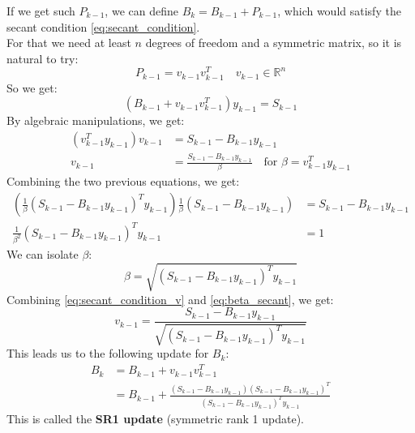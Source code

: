 \documentclass[12pt, openany]{report}
\newcommand{\R}{\mathbb{R}}
\theoremstyle{definition}
\begin{document}
If we get such $P_{k-1}$, we can define $B_k = B_{k-1} + P_{k-1}$, which would satisfy the secant condition \eqref{eq:secant_condition}.\\
For that we need at least $n$ degrees of freedom and a symmetric matrix, so it is natural to try:
\begin{equation}
	P_{k-1} = v_{k-1} v_{k-1}^T \quad v_{k-1} \in \R^{n}
\end{equation}
So we get:
\begin{equation}
	\left(B_{k-1} + v_{k-1} v_{k-1}^T\right) y_{k-1} = S_{k-1}
\end{equation}
By algebraic manipulations, we get:
\begin{equation}\label{eq:secant_condition_v}
	\begin{aligned}
		\left(v_{k-1}^T y_{k-1}\right) v_{k-1} &= S_{k-1} - B_{k-1} y_{k-1}\\
		v_{k-1} &= \frac{S_{k-1}-B_{k-1} y_{k-1}}{\beta} \quad \text{for } \beta = v_{k-1}^T y_{k-1} 
	\end{aligned}
\end{equation}
Combining the two previous equations, we get:
\begin{equation}
	\begin{aligned}
		\left(\frac{1}{\beta} \left(S_{k-1} - B_{k-1} y_{k-1}\right)^T y_{k-1} \right)\frac{1}{\beta} \left(S_{k-1} - B_{k-1} y_{k-1}\right) &= S_{k-1} - B_{k-1} y_{k-1}\\
		\frac{1}{\beta^2} \left(S_{k-1} - B_{k-1} y_{k-1}\right)^T y_{k-1} &= 1
	\end{aligned}
\end{equation}
We can isolate $\beta$:
\begin{equation}\label{eq:beta_secant}
	\beta = \sqrt{\left(S_{k-1} - B_{k-1} y_{k-1}\right)^T y_{k-1}}
\end{equation}
Combining \eqref{eq:secant_condition_v} and \eqref{eq:beta_secant}, we get:
\begin{equation}
	v_{k-1} = \frac{S_{k-1}-B_{k-1} y_{k-1}}{\sqrt{\left(S_{k-1} - B_{k-1} y_{k-1}\right)^T y_{k-1}}}
\end{equation}
This leads us to the following update for $B_k$:
\begin{equation}
	\begin{aligned}
		B_k &= B_{k-1} + v_{k-1} v_{k-1}^T\\
		&= B_{k-1} + \frac{\left(S_{k-1}-B_{k-1} y_{k-1}\right)\left(S_{k-1}-B_{k-1} y_{k-1}\right)^T}{\left(S_{k-1} - B_{k-1} y_{k-1}\right)^T y_{k-1}}
	\end{aligned}
\end{equation}
This is called the \textbf{SR1 update} (symmetric rank 1 update).\\
\end{document}
